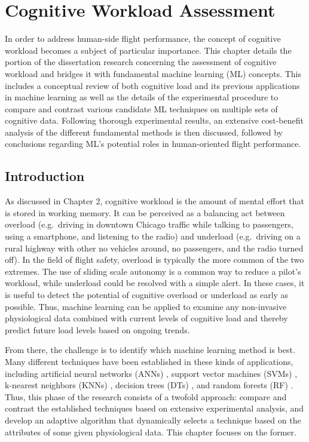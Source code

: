 \documentclass[12pt]{uthesis-v12}  %
\begin{document}
\chapter{Cognitive Workload Assessment}

In order to address human-side flight performance, the concept of cognitive workload becomes a subject of particular importance. This chapter details the portion of the dissertation research concerning the assessment of cognitive workload and bridges it with fundamental machine learning (ML) concepts. This includes a conceptual review of both cognitive load and its previous applications in machine learning as well as the details of the experimental procedure to compare and contrast various candidate ML techniques on multiple sets of cognitive data. Following thorough experimental results, an extensive cost-benefit analysis of the different fundamental methods is then discussed, followed by conclusions regarding ML's potential roles in human-oriented flight performance.

\section{Introduction}

As discussed in Chapter 2, cognitive workload is the amount of mental effort that is stored in working memory. It can be perceived as a balancing act between overload (e.g.~driving in downtown Chicago traffic while talking to passengers, using a smartphone, and listening to the radio) and underload (e.g.~driving on a rural highway with other no vehicles around, no passengers, and the radio turned off). In the field of flight safety, overload is typically the more common of the two extremes. The use of sliding scale autonomy is a common way to reduce a pilot's workload, while underload could be resolved with a simple alert. In these cases, it is useful to detect the potential of cognitive overload or underload as early as possible. Thus, machine learning can be applied to examine any non-invasive physiological data combined with current levels of cognitive load and thereby predict future load levels based on ongoing trends.

From there, the challenge is to identify which machine learning method is best. Many different techniques have been established in these kinds of applications, including artificial neural networks (ANNs) \cite{chatterji,gianazza,wilson,wilson2,wilson3,hefron,juhaniak}, support vector machines (SVMs) \cite{jin,son,putze,liang,ziegler,yin}, k-nearest neighbors (KNNs) \cite{solovey,calibo,girouard}, decision trees (DTs) \cite{solovey}, and random forests (RF) \cite{liaw}. Thus, this phase of the research consists of a twofold approach: compare and contrast the established techniques based on extensive experimental analysis, and develop an adaptive algorithm that dynamically selects a technique based on the attributes of some given physiological data. This chapter focuses on the former.
\end{document}
